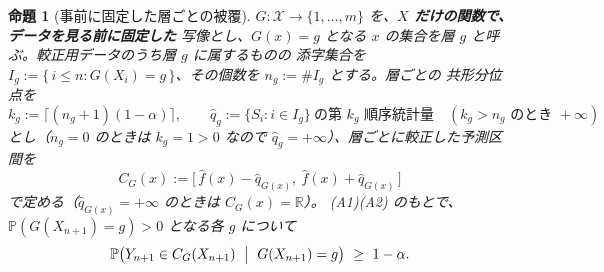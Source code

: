 \documentclass[a4paper,11pt]{jsarticle}
\theoremstyle{definition}
\theoremstyle{plain}
\newtheorem{proposition}[definition]{命題}
\theoremstyle{remark}
\newcommand{\Prob}{\mathbb{P}}
\newcommand{\Real}{\mathbb{R}}
\newcommand{\qhat}{\hat{q}}
\newcommand{\fhat}{\hat{f}}
\begin{document}
\begin{proposition}[事前に固定した層ごとの被覆]
  \label{prop:x-conditional-group}
  $G\colon\mathcal{X}\to\{1,\dots,m\}$ を、\textbf{$X$ だけの関数で、データを見る前に固定した}
  写像とし、$G(x)=g$ となる $x$ の集合を層 $g$ と呼ぶ。較正用データのうち層 $g$ に属するものの
  添字集合を $I_g:=\{\,i\le n: G(X_i)=g\,\}$、その個数を $n_g:=\#I_g$ とする。層ごとの
  共形分位点を
  \begin{equation*}
    k_g:=\lceil (n_g+1)(1-\alpha)\rceil,\qquad
    \qhat_g:=\{S_i: i\in I_g\}\ \text{の第 $k_g$ 順序統計量}\quad(k_g>n_g \text{ のとき }+\infty)
  \end{equation*}
  とし（$n_g=0$ のときは $k_g=1>0$ なので $\qhat_g=+\infty$）、層ごとに較正した予測区間を
  \begin{equation}
    \label{eq:x-conditional-group}
    C_G(x):=\bigl[\,\fhat(x)-\qhat_{G(x)},\ \fhat(x)+\qhat_{G(x)}\,\bigr]
  \end{equation}
  で定める（$\qhat_{G(x)}=+\infty$ のときは $C_G(x)=\Real$）。
  (A1)(A2) のもとで、$\Prob(G(X_{n+1})=g)>0$ となる各 $g$ について
  \begin{equation*}
    \Prob\bigl(Y_{n+1}\in C_G(X_{n+1})\ \bigm|\ G(X_{n+1})=g\bigr)\ \ge\ 1-\alpha .
  \end{equation*}
\end{proposition}
\end{document}
